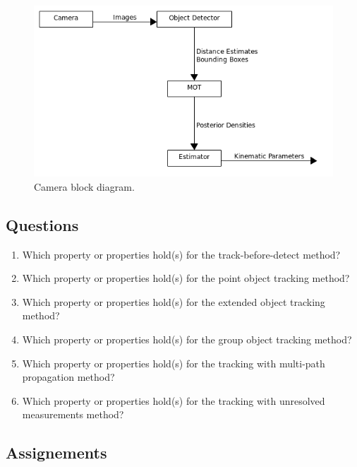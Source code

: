 \begin{figure}[!htb]
\begin{center}
\includegraphics[scale=0.480]{img/object_tracking/camera_block_diagram.png}
\end{center}
\caption{Camera block diagram.}
\label{camera_block_diagram}
\end{figure}

\subsection{Questions}

\begin{enumerate}
\item Which property or properties hold(s) for the track-before-detect method?
\item Which property or properties hold(s) for the point object tracking method?
\item Which property or properties hold(s) for the extended object tracking method?
\item Which property or properties hold(s) for the group object tracking method?
\item Which property or properties hold(s) for the tracking with multi-path propagation method?
\item Which property or properties hold(s) for the tracking with unresolved measurements method?
\end{enumerate}

\subsection{Assignements}
